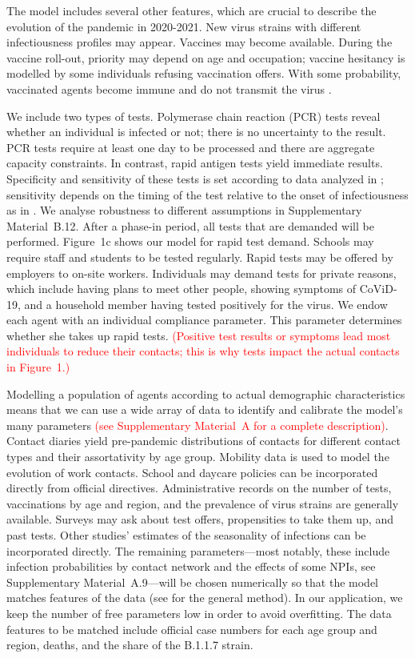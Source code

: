 \documentclass[fleqn,10pt]{wlscirep}
\begin{document}
The model includes several other features, which are crucial to describe the evolution
of the pandemic in 2020-2021. New virus strains with different infectiousness profiles
may appear. Vaccines may become available. During the vaccine roll-out, priority may
depend on age and occupation; vaccine hesitancy is modelled by some individuals refusing
vaccination offers. With some probability, vaccinated agents become immune and do not
transmit the virus \cite{Hunter2021, LevineTiefenbrun2021, Petter2021, Pritchard2021}.

We include two types of tests. Polymerase chain reaction (PCR) tests reveal whether an
individual is infected or not; there is no uncertainty to the result. PCR tests require
at least one day to be processed and there are aggregate capacity constraints. In
contrast, rapid antigen tests yield immediate results. Specificity and sensitivity of
these tests is set according to data analyzed in
\cite{Bruemmer2021,Scheiblauer2021,Ozcurumez2021}; sensitivity depends on the timing of
the test relative to the onset of infectiousness as in \cite{Smith2021}. We analyse
robustness to different assumptions in Supplementary Material~B.12. After a phase-in
period, all tests that are demanded will be performed. Figure~1c shows our model for
rapid test demand. Schools may require staff and students to be tested regularly. Rapid
tests may be offered by employers to on-site workers. Individuals may demand tests for
private reasons, which include having plans to meet other people, showing symptoms of
CoViD-19, and a household member having tested positively for the virus. We endow each
agent with an individual compliance parameter. This parameter determines whether she
takes up rapid tests. \textcolor{red}{(Positive test results or symptoms lead most
individuals to reduce their contacts; this is why tests impact the actual contacts in
Figure~1.)}

Modelling a population of agents according to actual demographic characteristics means
that we can use a wide array of data to identify and calibrate the model's many
parameters \textcolor{red}{(see Supplementary Material~A for a complete description)}.
Contact diaries yield pre-pandemic distributions of contacts for different contact types
and their assortativity by age group. Mobility data is used to model the evolution of
work contacts. School and daycare policies can be incorporated directly from official
directives. Administrative records on the number of tests, vaccinations by age and
region, and the prevalence of virus strains are generally available. Surveys may ask
about test offers, propensities to take them up, and past tests. Other studies'
estimates of the seasonality of infections can be incorporated directly. The remaining
parameters---most notably, these include infection probabilities by contact network and
the effects of some NPIs, see Supplementary Material~A.9---will be chosen numerically so
that the model matches features of the data (see \cite{McFadden1989} for the general
method). In our application, we keep the number of free parameters low in order to avoid
overfitting. The data features to be matched include official case numbers for each age
group and region, deaths, and the share of the B.1.1.7 strain.
\end{document}
